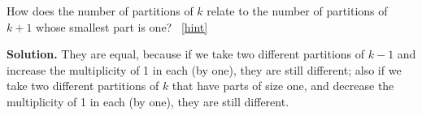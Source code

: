 \documentclass{book}
\begin{document}
\setcounter{project}{213}
\addtocounter{project}{-1}
\begin{activity}[]\label{activity-206}
\hypertarget{p-1202}{}%
How does the number of partitions of \(k\) relate to the number of partitions of \(k+1\) whose smallest part is one?%
~\hfill{\tiny\hyperlink{a-213}{[hint]}\hypertarget{q-213}{}}\par\smallskip%
\noindent\textbf{Solution.}\hypertarget{solution-139}{}\quad%
\hypertarget{p-1204}{}%
They are equal, because if we take two different partitions of \(k-1\) and increase the multiplicity of 1 in each (by one), they are still different; also if we take two different partitions of \(k\) that have parts of size one, and decrease the multiplicity of 1 in each (by one), they are still different.%
\end{activity}
\end{document}
